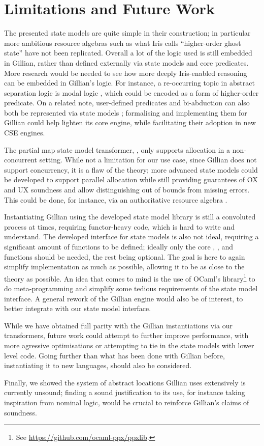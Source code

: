 \section{Limitations and Future Work}

The presented state models are quite simple in their construction; in particular more ambitious resource algebras such as what Iris calls ``higher-order ghost state'' \cite{iris} have not been replicated. Overall a lot of the logic used is still embedded in Gillian, rather than defined externally via state models and core predicates. More research would be needed to see how more deeply Iris-enabled reasoning can be embedded in Gillian's logic. For instance, a re-occurring topic in abstract separation logic is modal logic \cite{higherorderseplogic,iris,statesoundness}, which could be encoded as a form of higher-order predicate. On a related note, user-defined predicates and bi-abduction can also both be represented via state models \cite{sacha-phd}; formalising and implementing them for Gillian could help lighten its core engine, while facilitating their adoption in new CSE engines.

The partial map state model transformer, \PMap, only supports allocation in a non-concurrent setting. While not a limitation for our use case, since Gillian does not support concurrency, it is a flaw of the theory; more advanced state models could be developed to support parallel allocation while still providing guarantees of OX and UX soundness and allow distinguishing out of bounds from missing errors. This could be done, for instance, via an authoritative resource algebra \cite{iris}.

Instantiating Gillian using the developed state model library is still a convoluted process at times, requiring functor-heavy code, which is hard to write and understand. The developed interface for state models is also not ideal, requiring a significant amount of functions to be defined; ideally only the core \execac, \consume, \produce{} and \fix{} functions should be needed, the rest being optional. The goal is here to again simplify implementation as much as possible, allowing it to be as close to the theory as possible. An idea that comes to mind is the use of OCaml's  library\footnote{See \url{https://github.com/ocaml-ppx/ppxlib}.} to do meta-programming and simplify some tedious requirements of the state model interface. A general rework of the Gillian engine would also be of interest, to better integrate with our state model interface.

While we have obtained full parity with the Gillian instantiations via our transformers, future work could attempt to further improve performance, with more agressive optimisations or attempting to tie in the state models with lower level code. Going further than what has been done with Gillian before, instantiating it to new languages, should also be considered.

Finally, we showed the system of abstract locations Gillian uses extensively is currently unsound; finding a sound justification to its use, for instance taking inspiration from nominal logic, would be crucial to reinforce Gillian's claims of soundness.
